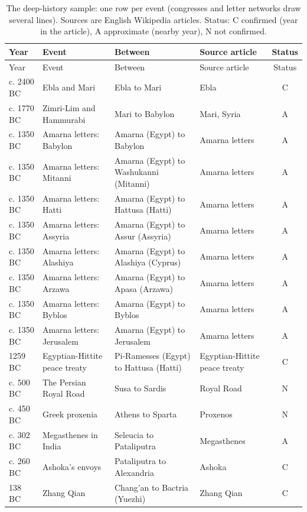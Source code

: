\documentclass[11pt,a4paper]{article}
\begin{document}
{\small\begin{longtable}{p{1.6cm}p{4.5cm}p{3.7cm}p{3.6cm}c}\caption{The deep-history sample: one row per event (congresses and letter networks draw several lines). Sources are English Wikipedia articles. Status: C confirmed (year in the article), A approximate (nearby year), N not confirmed.}\label{tab:deep}\\\toprule Year & Event & Between & Source article & Status\\\midrule\endfirsthead\toprule Year & Event & Between & Source article & Status\\\midrule\endhead
c. 2400 BC & Ebla and Mari & Ebla to Mari & Ebla & C\\
c. 1770 BC & Zimri-Lim and Hammurabi & Mari to Babylon & Mari, Syria & A\\
c. 1350 BC & Amarna letters: Babylon & Amarna (Egypt) to Babylon & Amarna letters & A\\
c. 1350 BC & Amarna letters: Mitanni & Amarna (Egypt) to Washukanni (Mitanni) & Amarna letters & A\\
c. 1350 BC & Amarna letters: Hatti & Amarna (Egypt) to Hattusa (Hatti) & Amarna letters & A\\
c. 1350 BC & Amarna letters: Assyria & Amarna (Egypt) to Assur (Assyria) & Amarna letters & A\\
c. 1350 BC & Amarna letters: Alashiya & Amarna (Egypt) to Alashiya (Cyprus) & Amarna letters & A\\
c. 1350 BC & Amarna letters: Arzawa & Amarna (Egypt) to Apasa (Arzawa) & Amarna letters & A\\
c. 1350 BC & Amarna letters: Byblos & Amarna (Egypt) to Byblos & Amarna letters & A\\
c. 1350 BC & Amarna letters: Jerusalem & Amarna (Egypt) to Jerusalem & Amarna letters & A\\
1259 BC & Egyptian-Hittite peace treaty & Pi-Ramesses (Egypt) to Hattusa (Hatti) & Egyptian-Hittite peace treaty & C\\
c. 500 BC & The Persian Royal Road & Susa to Sardis & Royal Road & N\\
c. 450 BC & Greek proxenia & Athens to Sparta & Proxenos & N\\
c. 302 BC & Megasthenes in India & Seleucia to Pataliputra & Megasthenes & A\\
c. 260 BC & Ashoka's envoys & Pataliputra to Alexandria & Ashoka & C\\
138 BC & Zhang Qian & Chang'an to Bactria (Yuezhi) & Zhang Qian & C\\

\end{longtable}}
\end{document}
